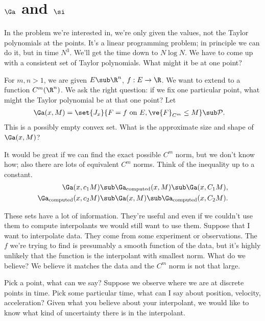 
\section{$\Ga$ and $\si$}

In the problem we're interested in, we're only given the values, not the Taylor polynomials at the points. It's a linear programming problem; in principle we can do it, but in time $N^3$. We'll get the time down to $N\log N$. We have to come up with a consistent set of Taylor polynomials. What might it be at one point?

For $m,n>1$, we are given $E\sub \R^n$, $f:E\to \R$. We want to extend to a function $C^m(\R^n)$. 
We ask the right question: if we fix one particular point, what might the Taylor polynomial be at that one point?
Let 
\begin{align}
\Ga(x,M) &= \set{J_x}{F=f\text{ on }E, \ve{F}_{C^m}\le M}\sub \cal P.
\end{align}
This is a possibly empty convex set.
What is the approximate size and shape of $\Ga(x,M)$? 

It would be great if we can find the exact possible $C^m$ norm, but we don't know how; also there are lots of equivalent $C^m$ norms. Think of the inequality up to a constant. 
\begin{align}
\Ga(x,c_1M)&\sub
\Ga_{\text{computed}}(x,M) \sub \Ga (x,C_1M),\\
\Ga_{\text{computed}}(x,c_2M)& \sub \Ga(x,M)\sub \Ga_{\text{computed}}(x,C_2M).
\end{align}

These sets have a lot of information. They're useful and even if we couldn't use them to compute interpolants we would still want to use them.
Suppose that I want to interpolate data. They come from some experiment or observations. The $f$ we're trying to find is presumably a smooth function of the data, but it's highly unlikely that the function is the interpolant with smallest norm. What do we believe? We believe it matches the data and the $C^m$ norm is not that large. 

Pick a point, what can we say? Suppose we observe where we are at discrete points in time. Pick some particular time, what can I say about position, velocity, acceleration? %
Given what you believe about your interpolant, we would like to know what kind of uncertainty there is in the interpolant. 

